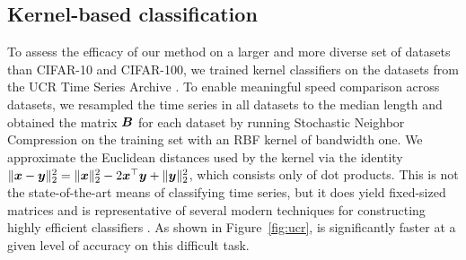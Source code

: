\vspace{-2mm}
\subsection{Kernel-based classification}
\vspace{-.5mm}

To assess the efficacy of our method on a larger and more diverse set of datasets than CIFAR-10 and CIFAR-100, we trained kernel classifiers on the datasets from the UCR Time Series Archive \cite{UCRArchive2018}. To enable meaningful speed comparison across datasets, we resampled the time series in all datasets to the median length and obtained the matrix $\bm{B}$ for each dataset by running Stochastic Neighbor Compression \cite{snc} on the training set with an RBF kernel of bandwidth one.
We approximate the Euclidean distances used by the kernel via the identity $\lVert\bm{x} - \bm{y}\rVert_2^2 = \lVert\bm{x}\rVert_2^2 - 2\bm{x}^\top \bm{y} + \lVert\bm{y}\rVert_2^2$, which consists only of dot products.
This is not the state-of-the-art means of classifying time series, but it does yield fixed-sized matrices and is representative of several modern techniques for constructing highly efficient classifiers \cite{snc,dsnc,bnc,protonn}.
\vspace{-.5mm}
As shown in Figure~\ref{fig:ucr}, \oursp is significantly faster at a given level of accuracy on this difficult task.
